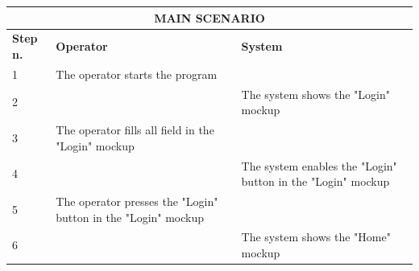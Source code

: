 {{{\begin{center}
			\begin{tabular}{|p{2cm}|p{6cm}|p{6cm}|}
			\hline
				\multicolumn{3}{|c|}{MAIN SCENARIO} \\
			\hline
				\centering \vspace{1mm} \bfseries{Step n.} \vspace{1mm} & \vspace{1mm} \bfseries{Operator} \vspace{1mm} & \vspace{1mm} \bfseries{System} \vspace{1mm}\\
			\hline
				\vspace{1mm} 1 \vspace{1mm} &
				\vspace{1mm} The operator starts the program \vspace{1mm} & 
				\vspace{1mm} \vspace{1mm} \\
			\hline
				\vspace{1mm} 2 \vspace{1mm} &
				\vspace{1mm} \vspace{1mm} & 
				\vspace{1mm} The system shows the "Login" mockup\vspace{1mm} \\
			\hline
				\vspace{1mm} 3 \vspace{1mm} &
				\vspace{1mm} The operator fills all field in the "Login" mockup \vspace{1mm} & 
				\vspace{1mm} \vspace{1mm} \\
			\hline
				\vspace{1mm} 4 \vspace{1mm} &
				\vspace{1mm} \vspace{1mm} & 
				\vspace{1mm} The system enables the "Login" button in the "Login" mockup \vspace{1mm} \\
			\hline
				\vspace{1mm} 5 \vspace{1mm} &
				\vspace{1mm} The operator presses the "Login" button in the "Login" mockup \vspace{1mm} & 
				\vspace{1mm} \vspace{1mm} \\
			\hline
				\vspace{1mm} 6 \vspace{1mm} &
				\vspace{1mm} \vspace{1mm} & 
				\vspace{1mm} The system shows the "Home" mockup\vspace{1mm} \\
			\hline
			\end{tabular}
			

\end{center}}}}
